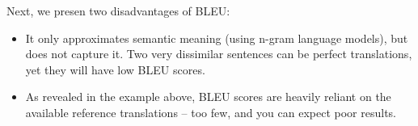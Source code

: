 \documentclass[12pt]{article}
\begin{document}
\begin{enumerate}[label=(\alph*)]
\begin{enumerate}[label=\roman*]
        Next, we presen two disadvantages of BLEU:
          \begin{itemize}
            \item It only approximates semantic meaning (using n-gram language models), but does not capture it. Two very dissimilar sentences can be perfect translations, yet they will have low BLEU scores.
            \item As revealed in the example above, BLEU scores are heavily reliant on the available reference translations -- too few, and you can expect poor results.
          \end{itemize}
    \end{enumerate}
\end{enumerate}
\end{document}
